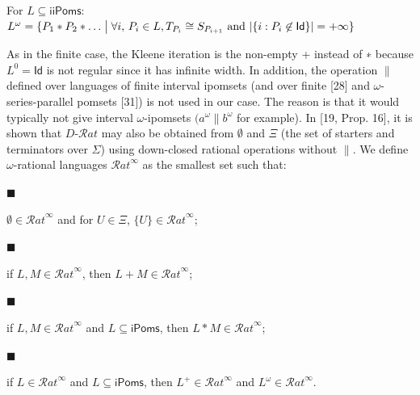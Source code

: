 For $L\subseteq\mathsf{iiPoms}$: $L^{\omega}={\{P_{1}*P_{2}*\dots\mathrel{\big{|}}\forall i,\,P_{i}\in L,T_{P_{i}}\cong S_{P_{i\text{+}1}}\text{ and }|{\{i:P_{i}\not\in\mathsf{Id}\}}|=+\infty\}}$\par
 
 
  
As in the finite case, the Kleene iteration is the non-empty + instead of ∗ because $L^{0}=\mathsf{Id}$ is not regular since it has infinite width. In addition, the operation $\parallel$ defined over languages of finite interval ipomsets (and over finite [28] and $\omega$-series-parallel pomsets [31]) is not used in our case. The reason is that it would typically not give interval $\omega$-ipomsets $(a^{\omega}\parallel b^{\omega}$ for example). In [19, Prop. 16], it is shown that $D\text{-}\mathcal{R}at$ may also be obtained from $\emptyset$ and $\Xi$ (the set of starters and terminators over $\Sigma$) using down-closed rational operations without $\|$. We define $\omega$-rational languages ${\mathcal{R}at}^{\infty}$ as the smallest set such that:\par
  
\par\noindent  $\blacksquare$ 
 
$\emptyset\in{\mathcal{R}at}^{\infty}$ and for $U\in\Xi$, ${\{U\}}\in{\mathcal{R}at}^{\infty}$;\par
 
 
 
\par\noindent  $\blacksquare$ 
 
if $L,M\in{\mathcal{R}at}^{\infty}$, then $L+M\in{\mathcal{R}at}^{\infty}$;\par
 
 
 
\par\noindent  $\blacksquare$ 
 
if $L,M\in{\mathcal{R}at}^{\infty}$ and $L\subseteq\mathsf{iPoms}$, then $L*M\in{\mathcal{R}at}^{\infty}$;\par
 
 
 
\par\noindent  $\blacksquare$ 
 
if $L\in{\mathcal{R}at}^{\infty}$ and $L\subseteq\mathsf{iPoms}$, then $L^{+}\in{\mathcal{R}at}^{\infty}$ and $L^{\omega}\in{\mathcal{R}at}^{\infty}$.\par
 
